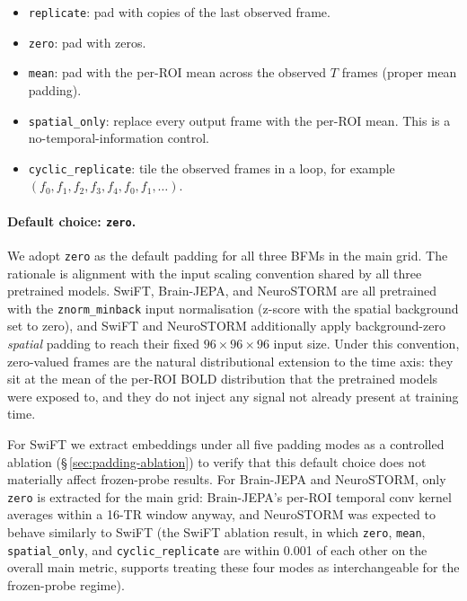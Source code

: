 \documentclass[11pt, a4paper]{article}
\begin{document}
\begin{itemize}[leftmargin=1.4em, itemsep=2pt]
  \item \texttt{replicate}: pad with copies of the last observed frame.
  \item \texttt{zero}: pad with zeros.
  \item \texttt{mean}: pad with the per-ROI mean across the observed $T$ frames (proper
        mean padding).
  \item \texttt{spatial\_only}: replace every output frame with the per-ROI mean. This is
        a no-temporal-information control.
  \item \texttt{cyclic\_replicate}: tile the observed frames in a loop, for example
        $(f_0, f_1, f_2, f_3, f_4, f_0, f_1, \dots)$.
\end{itemize}

\paragraph{Default choice: \texttt{zero}.}
We adopt \texttt{zero} as the default padding for all three BFMs in the main grid. The
rationale is alignment with the input scaling convention shared by all three pretrained
models. SwiFT, Brain-JEPA, and NeuroSTORM are all pretrained with the
\texttt{znorm\_minback} input normalisation (z-score with the spatial background set to
zero), and SwiFT and NeuroSTORM additionally apply background-zero \emph{spatial} padding
to reach their fixed $96 \times 96 \times 96$ input size. Under this convention,
zero-valued frames are the natural distributional extension to the time axis: they sit at
the mean of the per-ROI BOLD distribution that the pretrained models were exposed to, and
they do not inject any signal not already present at training time.

For SwiFT we extract embeddings under all five padding modes as a controlled ablation
(\S\,\ref{sec:padding-ablation}) to verify that this default choice does not materially
affect frozen-probe results. For Brain-JEPA and NeuroSTORM, only \texttt{zero} is
extracted for the main grid: Brain-JEPA's per-ROI temporal conv kernel averages within a
16-TR window anyway, and NeuroSTORM was expected to behave similarly to SwiFT (the
SwiFT ablation result, in which \texttt{zero}, \texttt{mean}, \texttt{spatial\_only}, and
\texttt{cyclic\_replicate} are within 0.001 of each other on the overall main metric,
supports treating these four modes as interchangeable for the frozen-probe regime).
\end{document}
